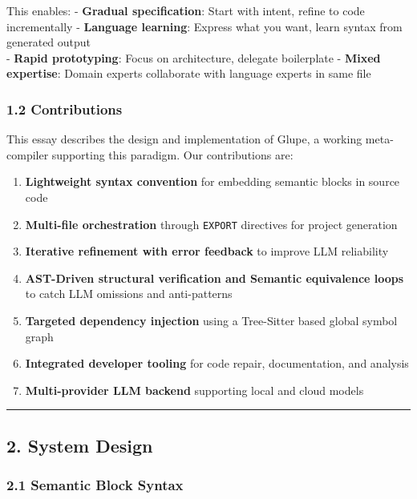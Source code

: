 \documentclass[11pt, a4paper]{article}
\providecommand{\tightlist}{\setlength{\itemsep}{0pt}\setlength{\parskip}{0pt}}
\begin{document}
This enables: - \textbf{Gradual specification}: Start with intent,
refine to code incrementally - \textbf{Language learning}: Express what
you want, learn syntax from generated output\\
- \textbf{Rapid prototyping}: Focus on architecture, delegate
boilerplate - \textbf{Mixed expertise}: Domain experts collaborate with
language experts in same file

\subsubsection{1.2 Contributions}\label{contributions}

This essay describes the design and implementation of Glupe, a working
meta-compiler supporting this paradigm. Our contributions are:

\begin{enumerate}
\def\labelenumi{\arabic{enumi}.}
\tightlist
\item
  \textbf{Lightweight syntax convention} for embedding semantic blocks
  in source code
\item
  \textbf{Multi-file orchestration} through \texttt{EXPORT} directives
  for project generation
\item
  \textbf{Iterative refinement with error feedback} to improve LLM
  reliability
\item
  \textbf{AST-Driven structural verification and Semantic equivalence
  loops} to catch LLM omissions and anti-patterns
\item
  \textbf{Targeted dependency injection} using a Tree-Sitter based
  global symbol graph
\item
  \textbf{Integrated developer tooling} for code repair, documentation,
  and analysis
\item
  \textbf{Multi-provider LLM backend} supporting local and cloud models
\end{enumerate}

\begin{center}\rule{0.5\linewidth}{0.5pt}\end{center}

\subsection{2. System Design}\label{system-design}

\subsubsection{2.1 Semantic Block Syntax}\label{semantic-block-syntax}
\end{document}
